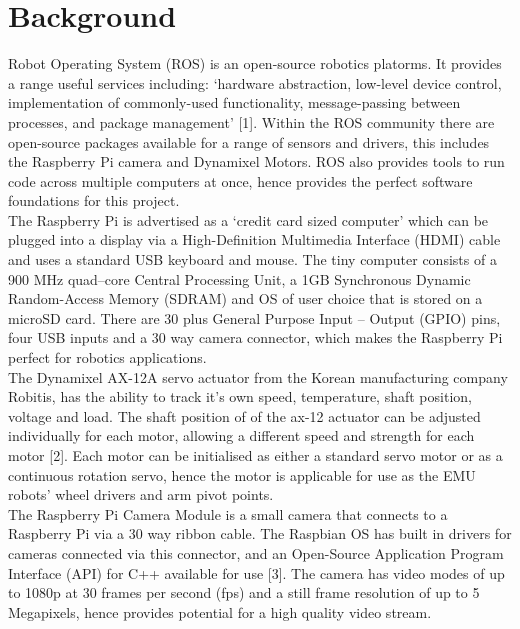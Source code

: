 \documentclass[titlepage,12pt,a4paper]{article}
\begin{document}
\section{Background}
Robot Operating System (ROS) is an open-source robotics platorms. It provides a range useful services including: ‘hardware abstraction, low-level device control, implementation of commonly-used functionality, message-passing between processes, and package management’ [1]. Within the ROS community there are open-source packages available for a range of sensors and drivers, this includes the Raspberry Pi camera and Dynamixel Motors. ROS also provides tools to run code across multiple computers at once, hence provides the perfect software foundations for this project.\\

\noindent The Raspberry Pi is advertised as a ‘credit card sized computer’ which can be plugged into a display via a High-Definition Multimedia Interface (HDMI) cable and uses a standard USB keyboard and mouse. The tiny computer consists of a 900 MHz quad–core Central Processing Unit, a 1GB Synchronous Dynamic Random-Access Memory (SDRAM) and OS of user choice that is stored on a microSD card. There are 30 plus General Purpose Input – Output (GPIO) pins, four USB inputs and a 30 way camera connector, which makes the Raspberry Pi perfect for robotics applications.\\

\noindent The Dynamixel AX-12A servo actuator from the Korean manufacturing company Robitis, has the ability to track it's own speed, temperature, shaft position, voltage and load. The shaft position of of the ax-12 actuator can be adjusted individually for each motor, allowing a different speed and strength for each motor [2]. Each motor can be initialised as either a standard servo motor or as a continuous rotation servo, hence the motor is applicable for use as the EMU robots’ wheel drivers and arm pivot points.\\

\noindent The Raspberry Pi Camera Module is a small camera that connects to a Raspberry Pi via a 30 way ribbon cable. The Raspbian OS has built in drivers for cameras connected via this connector, and an Open-Source Application Program Interface (API) for C++ available for use [3].  The camera has video modes of up to 1080p at 30 frames per second (fps) and a still frame resolution of up to 5 Megapixels, hence provides potential for a high quality video stream.\\
\end{document}
